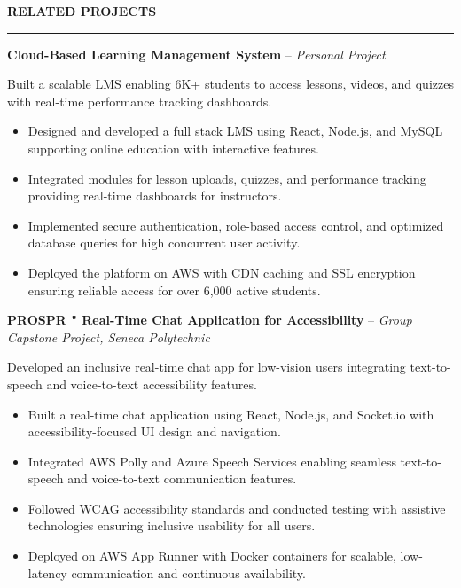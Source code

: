 \documentclass[10pt,letterpaper]{article}
\begin{document}
\vspace{6pt}

\textbf{RELATED PROJECTS}\\[-8pt]
\noindent\rule{\textwidth}{1pt}

\vspace{-2pt}

\textbf{Cloud-Based Learning Management System} -- \emph{Personal Project}

\vspace{-1pt}

Built a scalable LMS enabling 6K+ students to access lessons, videos, and quizzes with real-time performance tracking dashboards.
\vspace{-1pt}
\begin{itemize}
\item Designed and developed a full stack LMS using React, Node.js, and MySQL supporting online education with interactive features.
\item Integrated modules for lesson uploads, quizzes, and performance tracking providing real-time dashboards for instructors.
\item Implemented secure authentication, role-based access control, and optimized database queries for high concurrent user activity.
\item Deployed the platform on AWS with CDN caching and SSL encryption ensuring reliable access for over 6,000 active students.
\end{itemize}

\textbf{PROSPR " Real-Time Chat Application for Accessibility} -- \emph{Group Capstone Project, Seneca Polytechnic}

\vspace{-1pt}

Developed an inclusive real-time chat app for low-vision users integrating text-to-speech and voice-to-text accessibility features.
\vspace{-1pt}
\begin{itemize}
\item Built a real-time chat application using React, Node.js, and Socket.io with accessibility-focused UI design and navigation.
\item Integrated AWS Polly and Azure Speech Services enabling seamless text-to-speech and voice-to-text communication features.
\item Followed WCAG accessibility standards and conducted testing with assistive technologies ensuring inclusive usability for all users.
\item Deployed on AWS App Runner with Docker containers for scalable, low-latency communication and continuous availability.
\end{itemize}
\end{document}

